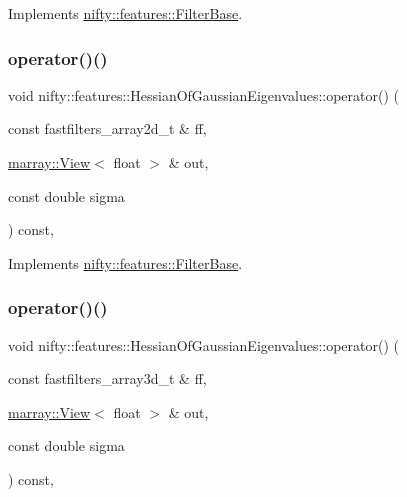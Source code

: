 Implements \hyperlink{structnifty_1_1features_1_1FilterBase_a1c278e2b6ef0cb2a5bba2f758c6855e2}{nifty\+::features\+::\+Filter\+Base}.

\mbox{\label{structnifty_1_1features_1_1HessianOfGaussianEigenvalues_a6195cb81a2b8a6570cb623e591c68781}} 
\subsubsection{\texorpdfstring{operator()()}{operator()()}\hspace{0.1cm}{\footnotesize\ttfamily [1/2]}}
{\footnotesize\ttfamily void nifty\+::features\+::\+Hessian\+Of\+Gaussian\+Eigenvalues\+::operator() (\begin{DoxyParamCaption}\item[{const fastfilters\+\_\+array2d\+\_\+t \&}]{ff,  }\item[{\hyperlink{classandres_1_1View}{marray\+::\+View}$<$ float $>$ \&}]{out,  }\item[{const double}]{sigma }\end{DoxyParamCaption}) const\hspace{0.3cm}{\ttfamily [inline]}, {\ttfamily [virtual]}}



Implements \hyperlink{structnifty_1_1features_1_1FilterBase_a17c77d36dd765c5ec0b163102428656c}{nifty\+::features\+::\+Filter\+Base}.

\mbox{\label{structnifty_1_1features_1_1HessianOfGaussianEigenvalues_a7c21f5d043af68d6f330c5b9bdf95310}} 
\subsubsection{\texorpdfstring{operator()()}{operator()()}\hspace{0.1cm}{\footnotesize\ttfamily [2/2]}}
{\footnotesize\ttfamily void nifty\+::features\+::\+Hessian\+Of\+Gaussian\+Eigenvalues\+::operator() (\begin{DoxyParamCaption}\item[{const fastfilters\+\_\+array3d\+\_\+t \&}]{ff,  }\item[{\hyperlink{classandres_1_1View}{marray\+::\+View}$<$ float $>$ \&}]{out,  }\item[{const double}]{sigma }\end{DoxyParamCaption}) const\hspace{0.3cm}{\ttfamily [inline]}, {\ttfamily [virtual]}}



